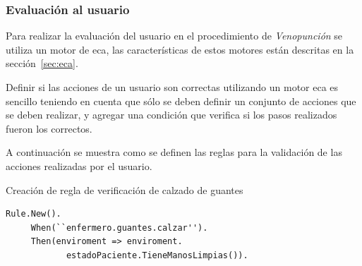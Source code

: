 %    
%
%
%
%

\subsubsection{Evaluación al usuario}

Para realizar la evaluación del usuario en el procedimiento de \emph{Venopunción} 
se utiliza un motor de \Gls{eca}, las características de estos motores están descritas 
en la sección~\ref{sec:eca}.

Definir si las acciones de un usuario son correctas utilizando un motor 
\Gls{eca} es sencillo teniendo en cuenta que sólo se deben definir un
conjunto de acciones que se deben realizar, y agregar una condición que verifica si
los pasos realizados fueron los correctos.


A continuación se muestra como se definen las reglas para la validación de las acciones realizadas 
por el usuario.

\begin{algorithm}[H]
\caption{Creación de regla de verificación de calzado de guantes}
\label{alg:rule_guante}
\lstset{style=sharpc}
\begin{lstlisting}
Rule.New().
     When(``enfermero.guantes.calzar'').
     Then(enviroment => enviroment.
            estadoPaciente.TieneManosLimpias()).
\end{lstlisting}
\end{algorithm}

